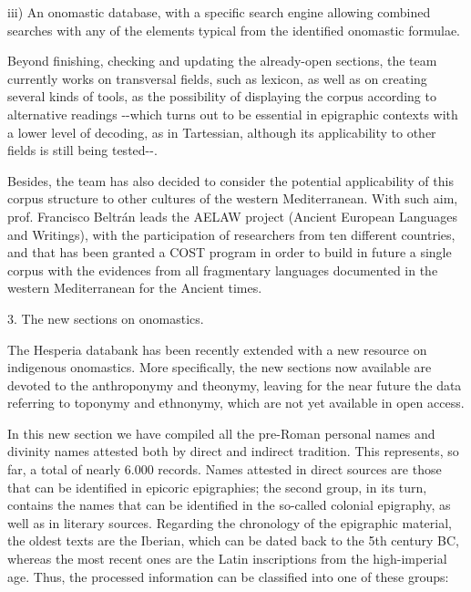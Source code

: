 \documentclass[amsthm,ebook]{saparticle}
\begin{document}
iii) An onomastic database, with a specific search engine allowing combined searches with any of the elements typical
from the identified onomastic formulae. 

Beyond finishing, checking and updating the already-open sections, the team currently works on transversal fields, such
as lexicon, as well as on creating several kinds of tools, as the possibility of displaying the corpus according to
alternative readings -{}-which turns out to be essential in epigraphic contexts with a lower level of decoding, as in
Tartessian, although its applicability to other fields is still being tested-{}-. 

Besides, the team has also decided to consider the potential applicability of this corpus structure to other cultures of
the western Mediterranean. With such aim, prof. Francisco Beltrán leads the AELAW project (Ancient European Languages
and Writings), with the participation of researchers from ten different countries, and that has been granted a COST
program in order to build in future a single corpus with the evidences from all fragmentary languages documented in the
western Mediterranean for the Ancient times.

3. The new sections on onomastics.

The Hesperia databank has been recently extended with a new resource on indigenous onomastics. More specifically, the
new sections now available are devoted to the anthroponymy and theonymy, leaving for the near future the data referring
to toponymy and ethnonymy, which are not yet available in open access.

In this new section we have compiled all the pre-Roman personal names and divinity names attested both by direct and
indirect tradition. This represents, so far, a total of nearly 6.000 records. Names attested in direct sources are
those that can be identified in epicoric epigraphies; the second group, in its turn, contains the names that can be
identified in the so-called colonial epigraphy, as well as in literary sources. Regarding the chronology of the
epigraphic material, the oldest texts are the Iberian, which can be dated back to the 5th century BC, whereas the most
recent ones are the Latin inscriptions from the high-imperial age. Thus, the processed information can be classified
into one of these groups:
\end{document}
